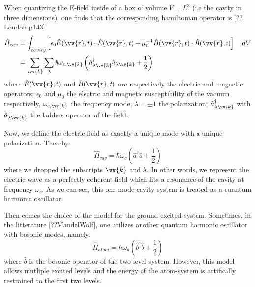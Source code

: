 \documentclass[12pt]{report}
\begin{document}
When quantizing the E-field inside of a box of volume $V = L^3$ (i.e the cavity in three dimensions), one finds that the corresponding hamiltonian operator is [??Loudon p143]:
\begin{align}
\hat{H}_{cav} &= \int_{cavity} \left[\epsilon_0 \hat{E}(\vv{r}, t) \cdot \hat{E}(\vv{r}, t) + \mu_0^{-1} \hat{B}(\vv{r}, t) \cdot \hat{B}(\vv{r}, t)\right] \quad dV\\
&= \sum_{\vv{k}} \sum_{\lambda} \hbar \omega_{c,\vv{k}} \left( \hat{a}_{\lambda \vv{k}}^\dag \hat{a}_{\lambda \vv{k}} + \frac{1}{2} \right)
\end{align}
where $\hat{E}(\vv{r}, t)$ and $\hat{B}(\vv{r}, t)$ are respectively the electric and magnetic operators; $\epsilon_0$ and $\mu_0$ the electric and magnetic susceptibility of the vacuum respectively, $\omega_{c,\vv{k}}$ the frequency mode; $\lambda=\pm 1$ the polarization; $\hat{a}_{\lambda \vv{k}}^\dag$ with $\hat{a}_{\lambda \vv{k}}^\dag$ the ladders operator of the field.

Now, we define the electric field as exactly a unique mode with a unique polarization. Thereby:
\begin{equation}
\hat{H}_{cav} = \hbar \omega_c \left( \hat{a}^\dag \hat{a} + \frac{1}{2} \right)
\end{equation}
where we dropped the subscripts $\vv{k}$ and $\lambda$. In other words, we represent the electric wave as a perfectly coherent field which fits a resonance of the cavity at frequency $\omega_c$. As we can see, this one-mode cavity system is treated as a quantum harmonic oscillator.

Then comes the choice of the model for the ground-excited system. Sometimes, in the litterature [??MandelWolf], one utilizes another quantum harmonic oscillator with bosonic modes, namely:
\begin{equation}
\label{sec_bosonic_mw}
\hat{H}_{atom} = \hbar \omega_a \left( \hat{b}^\dag \hat{b} + \frac{1}{2} \right)
\end{equation}
where $\hat{b}$ is the bosonic operator of the two-level system. However, this model allows mutliple excited levels and the energy of the atom-system is artifically restrained to the first two levels.
\end{document}
